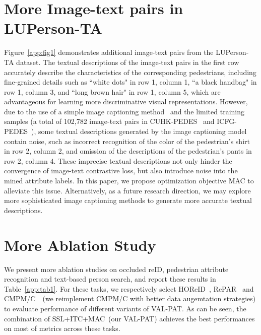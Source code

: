 \documentclass[final]{cvpr}
\begin{document}
\section{More Image-text pairs in LUPerson-TA}
Figure~\ref{app:fig1} demonstrates additional image-text pairs from the LUPerson-TA dataset. 
The textual descriptions of the image-text pairs in the first row accurately describe the characteristics of the corresponding pedestrians, including fine-grained details such as ``white dots" in row 1, column 1, ``a black handbag" in row 1, column 3, and ``long brown hair" in row 1, column 5, which are advantageous for learning more discriminative visual representations. 
However, due to the use of a simple image captioning method~\cite{xu2015show} and the limited training samples (a total of 102,782 image-text pairs in CUHK-PEDES~\cite{li2017person} and ICFG-PEDES~\cite{ding2021semantically}), some textual descriptions generated by the image captioning model contain noise, such as incorrect recognition of the color of the pedestrian's shirt in row 2, column 2, and omission of the descriptions of the pedestrian's pants in row 2, column 4. 
These imprecise textual descriptions not only hinder the convergence of image-text contrastive loss, but also introduce noise into the mined attribute labels. 
In this paper, we propose optimization objective MAC to alleviate this issue. 
Alternatively, as a future research direction, we may explore more sophisticated image captioning methods to generate more accurate textual descriptions.



\section{More Ablation Study}
We present more ablation studies on occluded reID, pedestrian attribute recognition and text-based person search, and report these results in Table~\ref{app:tab1}.
For these tasks, we respectively select HOReID~\cite{wang2020high}, RePAR~\cite{jia2021rethinking} and CMPM/C~\cite{zhang2018deep}~(we reimplement CMPM/C with better data augemtation strategies) to evaluate performance of different variants of VAL-PAT.
As can be seen, the combination of SSL+ITC+MAC~(our VAL-PAT) achieves the best performances on most of metrics across these tasks.
\end{document}
